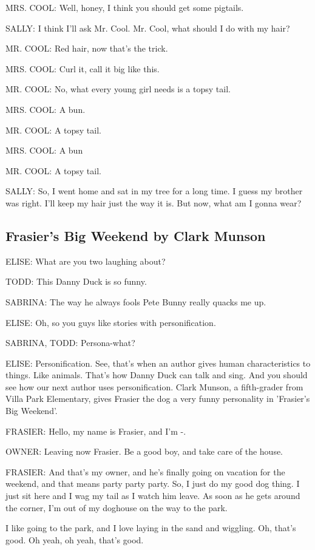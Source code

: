 MRS. COOL:
Well, honey, I think you should get some pigtails.

SALLY:
I think I'll ask Mr. Cool.
Mr. Cool, what should I do with my hair?

MR. COOL:
Red hair, now that's the trick.

MRS. COOL:
Curl it, call it big like this.

MR. COOL:
No, what every young girl needs is a topsy tail.

MRS. COOL:
A bun.

MR. COOL:
A topsy tail.

MRS. COOL:
A bun

MR. COOL:
A topsy tail.

SALLY:
So, I went home and sat in my tree for a long time.
I guess my brother was right.
I'll keep my hair just the way it is.
But now, what am I gonna wear?

\subsection{Frasier's Big Weekend by Clark Munson}

ELISE:
What are you two laughing about?

TODD:
This Danny Duck is so funny.

SABRINA:
The way he always fools Pete Bunny really quacks me up.

ELISE:
Oh, so you guys like stories with personification.

SABRINA, TODD:
Persona-what?

ELISE:
Personification.
See, that's when an author gives human characteristics to things.
Like animals.
That's how Danny Duck can talk and sing.
And you should see how our next author uses personification.
Clark Munson, a fifth-grader from Villa Park Elementary, gives Frasier the dog a very funny personality in 'Frasier's Big Weekend'.

FRASIER:
Hello, my name is Frasier, and I'm -.

OWNER:
Leaving now Frasier.
Be a good boy, and take care of the house.

FRASIER:
And that's my owner, and he's finally going on vacation for the weekend, and that means party party party.
So, I just do my good dog thing.
I just sit here and I wag my tail as I watch him leave.
As soon as he gets around the corner, I'm out of my doghouse on the way to the park.

I like going to the park, and I love laying in the sand and wiggling.
Oh, that's good.
Oh yeah, oh yeah, that's good.

